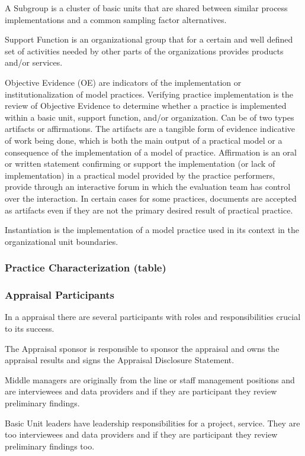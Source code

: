 A Subgroup is a cluster of basic units that are shared between similar process implementations and a common sampling factor alternatives.

Support Function is an organizational group that for a certain and well defined set of activities needed by other parts of the organizations provides products and/or services.


Objective Evidence (OE) are indicators of the implementation or institutionalization of model practices. Verifying practice implementation is the review of Objective Evidence to determine whether a practice is implemented within a basic unit, support function, and/or organization. Can be of two types artifacts or affirmations.
The artifacts are a tangible form of evidence indicative of work being done, which is both the main output of a practical model or a consequence of the implementation of a model of practice.
Affirmation is an oral or written statement confirming or support the implementation (or lack of implementation) in a practical model
provided by the practice performers, provide through an interactive forum in which the evaluation team has control over the
interaction.
In certain cases for some practices, documents are accepted as artifacts even if they are not the primary desired result of practical practice.

Instantiation is the implementation of a model practice used in its context in the organizational unit boundaries.

\subsubsection{Practice Characterization (table)}

\subsubsection{Appraisal Participants}
In a appraisal there are several participants with roles and responsibilities crucial to its success.

The Appraisal sponsor is responsible to sponsor the appraisal and owns the appraisal results and signs the Appraisal Disclosure Statement.

Middle managers are originally from the line or staff management positions and are interviewees and data providers and if they are participant they review preliminary findings.

Basic Unit leaders have leadership responsibilities for a project, service. They are too interviewees and data providers and if they are participant they review preliminary findings too.

